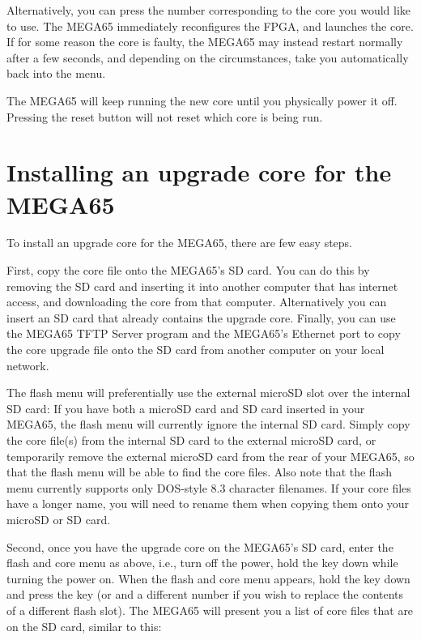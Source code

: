 Alternatively, you can press the number corresponding to the core you would
like to use. The MEGA65 immediately reconfigures the FPGA, and launches the core.  If for some reason
the core is faulty, the MEGA65 may instead restart normally after a few seconds, and depending on the
circumstances, take you automatically back into the menu.

The MEGA65 will keep running the new core until you physically power it off.  Pressing the reset button
will not reset which core is being run.

\section{Installing an upgrade core for the MEGA65}

To install an upgrade core for the MEGA65, there are few easy steps.

First, copy the core file onto the MEGA65's SD card.  You can do this by removing the SD card and inserting
it into another computer that has internet access, and downloading the core from that computer. Alternatively
you can insert an SD card that already contains the upgrade core. Finally, you can use the MEGA65 TFTP Server
program and the MEGA65's Ethernet port to copy the core upgrade file onto the SD card from another computer
on your local network.

The flash menu will preferentially use the external microSD slot over
the internal SD card: If you have both a microSD card and SD card
inserted in your MEGA65, the flash menu will currently ignore the
internal SD card.  Simply copy the core file(s) from the internal SD
card to the external microSD card, or temporarily remove the external
microSD card from the rear of your MEGA65, so that the flash menu will
be able to find the core files.  Also note that the flash menu
currently supports only DOS-style 8.3 character filenames. If your
core files have a longer name, you will need to rename them when
copying them onto your microSD or SD card.

Second, once you have the upgrade core on the MEGA65's SD card, enter the flash and core menu as above,
i.e., turn off the power, hold the  key down while turning the power on.  When the flash
and core menu appears, hold the  key down and press the
 key (or  and a different number if you wish to replace the
contents of a different flash slot).  The MEGA65
will present you a list of core files that are on the SD card, similar
to this:

